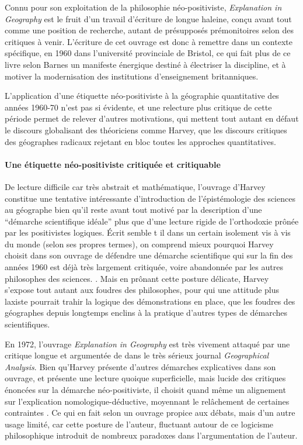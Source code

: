 Connu pour son exploitation de la philosophie néo-positiviste, \textit{Explanation in Geography} est le fruit d'un travail d'écriture de longue haleine, conçu avant tout comme une position de recherche, autant de présupposés prémonitoires selon \textcite[47]{Barnes2006b} des critiques à venir. L'écriture de cet ouvrage est donc à remettre dans un contexte spécifique, en 1960 dans l'université provinciale de Bristol, ce qui fait plus de ce livre selon Barnes \autocite[31-36]{Barnes2006b} un manifeste énergique destiné à électriser la discipline, et à motiver la modernisation des institutions d'enseignement britanniques.

L'application d'une étiquette néo-positiviste à la géographie quantitative des années 1960-70 n'est pas si évidente, et une relecture plus critique de cette période permet de relever d'autres motivations, qui mettent tout autant en défaut le discours globalisant des théoriciens comme Harvey, que les discours critiques des géographes radicaux rejetant en bloc toutes les approches quantitatives.

\paragraph{Une étiquette néo-positiviste critiquée et critiquable}
\label{p:etiquette_neopositiviste}

De lecture difficile car très abstrait et mathématique, l'ouvrage d'Harvey constitue une tentative intéressante d'introduction de l'épistémologie des sciences au géographe bien qu'il reste avant tout motivé par la description d'une \enquote{démarche scientifique idéale} plus que d'une lecture rigide de l'orthodoxie prônée par les positivistes logiques. Écrit semble t il dans un certain isolement vis à vis du monde (selon ses propres termes), on comprend mieux pourquoi Harvey choisit dans son ouvrage de défendre une démarche scientifique qui sur la fin des années 1960 est déjà très largement critiquée, voire abandonnée par les autres philosophes des sciences. \autocite[147]{Ouelbani2006}. Mais en prônant cette posture délicate, Harvey s'expose tout autant aux foudres des philosophes, pour qui une attitude plus laxiste pourrait trahir la logique des démonstrations en place, que les foudres des géographes depuis longtemps enclins à la pratique d'autres types de démarches scientifiques.


En 1972, l'ouvrage \textit{Explanation in Geography} est très vivement attaqué par une critique longue et argumentée de \textcite{Gale1972} dans le très sérieux journal \textit{Geographical Analysis}. Bien qu'Harvey présente d'autres démarches explicatives dans son ouvrage, et présente une lecture quoique superficielle, mais lucide des critiques énoncées sur la démarche néo-positiviste, il choisit quand même un alignement sur l'explication nomologique-déductive, moyennant le relâchement de certaines contraintes \autocite[39-40]{Paterson1984}. Ce qui en fait selon \textcite{Gale1972} un ouvrage propice aux débats, mais d'un autre usage limité, car cette posture de l'auteur, fluctuant autour de ce logicisme philosophique introduit de nombreux paradoxes dans l'argumentation de l'auteur.

